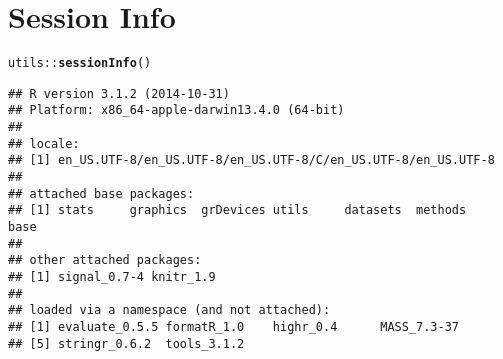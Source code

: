 \documentclass[10pt]{article}\usepackage[]{graphicx}\usepackage[]{color}
\makeatletter
\newcommand{\hlopt}[1]{\textcolor[rgb]{0,0,0}{#1}}%
\newcommand{\hlstd}[1]{\textcolor[rgb]{0.345,0.345,0.345}{#1}}%
\newcommand{\hlkwd}[1]{\textcolor[rgb]{0.737,0.353,0.396}{\textbf{#1}}}%
\newenvironment{kframe}{%
 \def\at@end@of@kframe{}%
 \ifinner\ifhmode%
  \def\at@end@of@kframe{\end{minipage}}%
  \begin{minipage}{\columnwidth}%
 \fi\fi%
 \def\FrameCommand##1{\hskip\@totalleftmargin \hskip-\fboxsep
 \colorbox{shadecolor}{##1}\hskip-\fboxsep
     \hskip-\linewidth \hskip-\@totalleftmargin \hskip\columnwidth}%
 \MakeFramed {\advance\hsize-\width
   \@totalleftmargin\z@ \linewidth\hsize
   \@setminipage}}%
 {\par\unskip\endMakeFramed%
 \at@end@of@kframe}
\newenvironment{knitrout}{}{} %
\makeatother
\begin{document}
\section*{Session Info}
\begin{knitrout}
\color{fgcolor}\begin{kframe}
\begin{alltt}
\hlstd{utils}\hlopt{::}\hlkwd{sessionInfo}\hlstd{()}
\end{alltt}
\begin{verbatim}
## R version 3.1.2 (2014-10-31)
## Platform: x86_64-apple-darwin13.4.0 (64-bit)
## 
## locale:
## [1] en_US.UTF-8/en_US.UTF-8/en_US.UTF-8/C/en_US.UTF-8/en_US.UTF-8
## 
## attached base packages:
## [1] stats     graphics  grDevices utils     datasets  methods   base     
## 
## other attached packages:
## [1] signal_0.7-4 knitr_1.9   
## 
## loaded via a namespace (and not attached):
## [1] evaluate_0.5.5 formatR_1.0    highr_0.4      MASS_7.3-37   
## [5] stringr_0.6.2  tools_3.1.2
\end{verbatim}
\end{kframe}
\end{knitrout}




\end{document}
